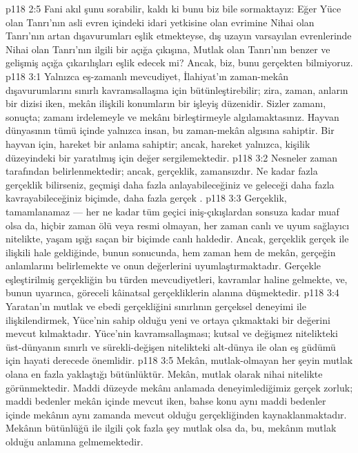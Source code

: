 \vs p118 2:5 Fani akıl şunu sorabilir, kaldı ki bunu biz bile sormaktayız: Eğer Yüce olan Tanrı’nın asli evren içindeki idari yetkisine olan evrimine Nihai olan Tanrı’nın artan dışavurumları eşlik etmekteyse, dış uzayın varsayılan evrenlerinde Nihai olan Tanrı’nın ilgili bir açığa çıkışına, Mutlak olan Tanrı’nın benzer ve gelişmiş açığa çıkarılışları eşlik edecek mi? Ancak, biz, bunu gerçekten bilmiyoruz.
\vs p118 3:1 Yalnızca eş\hyp{}zamanlı mevcudiyet, İlahiyat’ın zaman\hyp{}mekân dışavurumlarını sınırlı kavramsallaşma için bütünleştirebilir; zira, zaman, anların bir dizisi iken, mekân ilişkili konumların bir işleyiş düzenidir. Sizler zamanı, sonuçta; zamanı irdelemeyle ve mekânı birleştirmeyle algılamaktasınız. Hayvan dünyasının tümü içinde yalnızca insan, bu zaman\hyp{}mekân algısına sahiptir. Bir hayvan için, hareket bir anlama sahiptir; ancak, hareket yalnızca, kişilik düzeyindeki bir yaratılmış için değer sergilemektedir.
\vs p118 3:2 Nesneler zaman tarafından belirlenmektedir; ancak, gerçeklik, zamansızdır. Ne kadar fazla gerçeklik bilirseniz, geçmişi daha fazla anlayabileceğiniz ve geleceği daha fazla kavrayabileceğiniz biçimde, daha fazla gerçek .
\vs p118 3:3 Gerçeklik, tamamlanamaz --- her ne kadar tüm geçici iniş\hyp{}çıkışlardan sonsuza kadar muaf olsa da, hiçbir zaman ölü veya resmi olmayan, her zaman canlı ve uyum sağlayıcı nitelikte, yaşam ışığı saçan bir biçimde canlı haldedir. Ancak, gerçeklik gerçek ile ilişkili hale geldiğinde, bunun sonucunda, hem zaman hem de mekân, gerçeğin anlamlarını belirlemekte ve onun değerlerini uyumlaştırmaktadır. Gerçekle eşleştirilmiş gerçekliğin bu türden mevcudiyetleri, kavramlar haline gelmekte, ve, bunun uyarınca, göreceli kâinatsal gerçekliklerin alanına düşmektedir.
\vs p118 3:4 Yaratan’ın mutlak ve ebedi gerçekliğini sınırlının gerçeksel deneyimi ile ilişkilendirmek, Yüce’nin sahip olduğu yeni ve ortaya çıkmaktaki bir değerini mevcut kılmaktadır. Yüce’nin kavramsallaşması; kutsal ve değişmez nitelikteki üst\hyp{}dünyanın sınırlı ve sürekli\hyp{}değişen nitelikteki alt\hyp{}dünya ile olan eş güdümü için hayati derecede önemlidir.
\vs p118 3:5 Mekân, mutlak\hyp{}olmayan her şeyin mutlak olana en fazla yaklaştığı bütünlüktür. Mekân, mutlak olarak nihai nitelikte görünmektedir. Maddi düzeyde mekânı anlamada deneyimlediğimiz gerçek zorluk; maddi bedenler mekân içinde mevcut iken, bahse konu aynı maddi bedenler içinde mekânın aynı zamanda mevcut olduğu gerçekliğinden kaynaklanmaktadır. Mekânın bütünlüğü ile ilgili çok fazla şey mutlak olsa da, bu, mekânın mutlak olduğu anlamına gelmemektedir.

